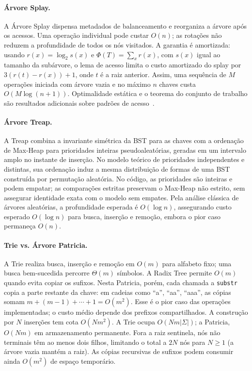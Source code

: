 \documentclass[11pt, a4paper]{article}
\begin{document}
\paragraph{Árvore Splay.}
A Árvore Splay dispensa metadados de balanceamento e reorganiza a árvore após os acessos. Uma operação individual pode custar $O(n)$; as rotações não reduzem a profundidade de todos os nós visitados. A garantia é amortizada: usando $r(x)=\log_2 s(x)$ e $\Phi(T)=\sum_x r(x)$, com $s(x)$ igual ao tamanho da subárvore, o lema de acesso limita o custo amortizado do splay por $3(r(t)-r(x))+1$, onde $t$ é a raiz anterior. Assim, uma sequência de $M$ operações iniciada com árvore vazia e no máximo $n$ chaves custa $O(M\log(n+1))$. Optimalidade estática e o teorema do conjunto de trabalho são resultados adicionais sobre padrões de acesso~\cite{sleator1985}.

\paragraph{Árvore Treap.}
A Treap combina a invariante simétrica da BST para as chaves com a ordenação de Max-Heap para prioridades inteiras pseudoaleatórias, geradas em um intervalo amplo no instante de inserção. No modelo teórico de prioridades independentes e distintas, sua ordenação induz a mesma distribuição de formas de uma BST construída por permutação aleatória. No código, as prioridades são inteiras e podem empatar; as comparações estritas preservam o Max-Heap não estrito, sem assegurar identidade exata com o modelo sem empates. Pela análise clássica de árvores aleatórias, a profundidade esperada é $O(\log n)$, assegurando custo esperado $O(\log n)$ para busca, inserção e remoção, embora o pior caso permaneça $O(n)$.

\paragraph{Trie vs. Árvore Patricia.}
A Trie realiza busca, inserção e remoção em $O(m)$ para alfabeto fixo; uma busca bem-sucedida percorre $\Theta(m)$ símbolos. A Radix Tree permite $O(m)$ quando evita copiar os sufixos. Nesta Patricia, porém, cada chamada a \texttt{substr} copia a parte restante da chave: em cadeias como ``a'', ``aa'', ``aaa'', as cópias somam $m+(m-1)+\cdots+1=O(m^2)$. Esse é o pior caso das operações implementadas; o custo médio depende dos prefixos compartilhados. A construção por $N$ inserções tem cota $O(Nm^2)$. A Trie ocupa $O(Nm|\Sigma|)$; a Patricia, $O(Nm)$ em armazenamento permanente. Fora a raiz sentinela, nós não terminais têm ao menos dois filhos, limitando o total a $2N$ nós para $N\ge1$ (a árvore vazia mantém a raiz). As cópias recursivas de sufixos podem consumir ainda $O(m^2)$ de espaço temporário.
\end{document}

